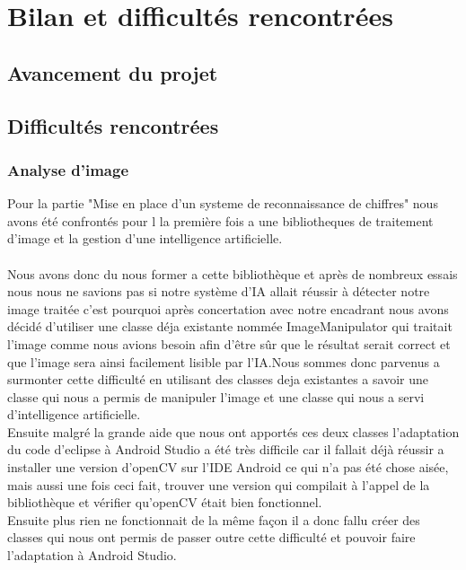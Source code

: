 \documentclass{article}
\begin{document}

\section{Bilan et difficultés rencontrées}

\subsection{Avancement du projet}





\subsection{Difficultés rencontrées}

\subsubsection{Analyse d'image}
Pour la partie "Mise en place d'un systeme de reconnaissance de chiffres" nous avons été confrontés pour l la première fois a une bibliotheques de traitement d'image et la gestion d'une intelligence artificielle.\\\\
Nous avons donc du nous former a cette bibliothèque et après de nombreux essais nous nous ne savions pas si notre système d'IA allait réussir à détecter notre image traitée c'est pourquoi après concertation avec notre encadrant nous avons décidé d'utiliser une classe déja existante nommée ImageManipulator qui traitait l'image comme nous avions besoin afin d'être sûr que le résultat serait correct et que l'image sera ainsi facilement lisible par l'IA.Nous sommes donc parvenus a surmonter cette difficulté en utilisant des classes deja existantes a savoir une classe qui nous a permis de manipuler l'image et une classe qui nous a servi d'intelligence artificielle.\\

Ensuite malgré la grande aide que nous ont apportés ces deux classes l'adaptation du code d'eclipse à Android Studio a été très difficile car il fallait déjà réussir a installer une version d'openCV sur l'IDE Android ce qui n'a pas été chose aisée, mais aussi une fois ceci fait, trouver une version qui compilait à l'appel de la bibliothèque et vérifier qu'openCV était bien fonctionnel.\\
Ensuite plus rien ne fonctionnait de la même façon il a donc fallu créer des classes qui nous ont permis de passer outre cette difficulté et pouvoir faire l'adaptation à Android Studio.\\
\end{document}
